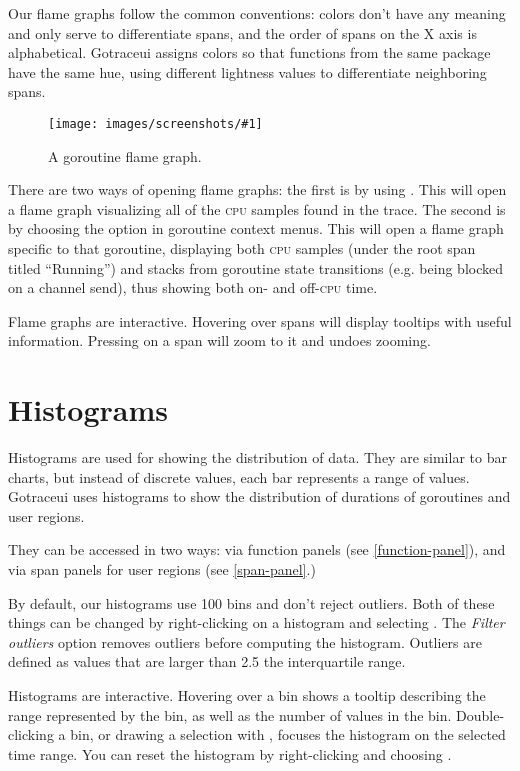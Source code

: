 \documentclass[10pt,letterpaper,oneside,openany,english]{memoir}
\newcommand{\shortcut}{\ctrl{} or \cmdmac}
\newcommand{\screenshot}[2]{%
\begin{figure}[!ht]
  \centering
  \texttt{[image: images/screenshots/\#1]}
  \caption{#2}
\end{figure}}
\begin{document}
Our flame graphs follow the common conventions:
colors don't have any meaning and only serve to differentiate spans,
and the order of spans on the X axis is alphabetical.
Gotraceui assigns colors so that functions from the same package have the same hue,
using different lightness values to differentiate neighboring spans.

\screenshot{flame-graph.png}{A goroutine flame graph.}

There are two ways of opening flame graphs:
the first is by using .
This will open a flame graph visualizing all of the \textsc{cpu} samples found in the trace.
The second is by choosing the  option in goroutine context menus.
This will open a flame graph specific to that goroutine,
displaying both \textsc{cpu} samples (under the root span titled \enquote{Running})
and stacks from goroutine state transitions (e.g. being blocked on a channel send),
thus showing both on- and off-\textsc{cpu} time.

Flame graphs are interactive.
Hovering over spans will display tooltips with useful information.
Pressing \keys{\shortcut + LMB} on a span will zoom to it and \keys{\shortcut + Z} undoes zooming.

\section{Histograms}\label{histograms}

Histograms are used for showing the distribution of data.
They are similar to bar charts, but instead of discrete values, each bar represents a range of values.
Gotraceui uses histograms to show the distribution of durations of goroutines and user regions.

They can be accessed in two ways: via function panels (see \cref{function-panel}),
and via span panels for user regions (see \cref{span-panel}.)

By default, our histograms use 100 bins and don't reject outliers.
Both of these things can be changed by right-clicking on a histogram and selecting .
The \emph{Filter outliers} option removes outliers before computing the histogram.
Outliers are defined as values that are larger than 2.5\times{} the interquartile range.

Histograms are interactive.
Hovering over a bin shows a tooltip describing the range represented by the bin, as well as the number of values in the bin.
Double-clicking a bin, or drawing a selection with \keys{\shortcut + LMB}, focuses the histogram on the selected time range.
You can reset the histogram by right-clicking and choosing .
\end{document}
